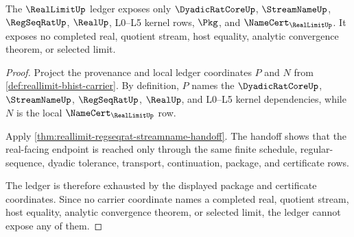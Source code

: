\begin{theorem}
\label{thm:reallimit-ledger-obligation}
The $\RealLimitUp$ ledger exposes only $\DyadicRatCoreUp$, $\StreamNameUp$,
$\RegSeqRatUp$, $\RealUp$, L0--L5 kernel rows, $\Pkg$, and
$\NameCert_{\RealLimitUp}$. It exposes no completed real, quotient stream, host
equality, analytic convergence theorem, or selected limit.
\end{theorem}
\begin{proof}
Project the provenance and local ledger coordinates $P$ and $N$ from
\autoref{def:reallimit-bhist-carrier}. By definition, $P$ names the
$\DyadicRatCoreUp$, $\StreamNameUp$, $\RegSeqRatUp$, $\RealUp$, and L0--L5
kernel dependencies, while $N$ is the local $\NameCert_{\RealLimitUp}$ row.

Apply \autoref{thm:reallimit-regseqrat-streamname-handoff}. The handoff shows
that the real-facing endpoint is reached only through the same finite schedule,
regular-sequence, dyadic tolerance, transport, continuation, package, and
certificate rows.

The ledger is therefore exhausted by the displayed package and certificate
coordinates. Since no carrier coordinate names a completed real, quotient
stream, host equality, analytic convergence theorem, or selected limit, the
ledger cannot expose any of them.
\end{proof}

